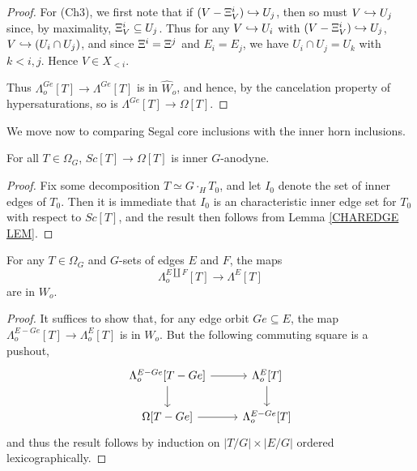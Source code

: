 \documentclass[a4paper,10pt,draft]{article}%
\begin{document}
\begin{proof}
      For (Ch3),
      we first note that if $(V - \Xi^i_V) \hookrightarrow U_j$, then so must $V \hookrightarrow U_j$
      since, by maximality, $\Xi^i_V \subseteq U_j$.
      Thus for any $V \hookrightarrow U_i$ with $(V - \Xi^i_V) \hookrightarrow U_j$,
      $V \hookrightarrow (U_i \cap U_j)$,
      and since $\Xi^i = \Xi^j$ and $E_i = E_j$, we have
      $U_i \cap U_j = U_k$ with $k < i,j$.
      Hence $V \in X_{< i}$.
      
      Thus $\Lambda^{G e}_o[T] \to \Lambda^{G e}[T]$ is in $\hat{W}_o$, and hence,
      by the cancelation property of hypersaturations,
      so is $\Lambda^{G e}[T] \to \Omega[T]$.
\end{proof}

We move now to comparing Segal core inclusions with the inner horn inclusions.

\begin{proposition}
      \label{SC_IN_GHORN_PROP}
      For all $T \in \Omega_G$, $Sc[T] \to \Omega[T]$ is inner $G$-anodyne.
\end{proposition}
\begin{proof}
      Fix some decomposition $T \simeq G \cdot_H T_0$, and let $I_0$ denote the set of inner edges of $T_0$.
      Then it is immediate that $I_0$ is an characteristic inner edge set for $T_0$ with respect to $Sc[T]$,
      and the result then follows from Lemma \ref{CHAREDGE LEM}.
\end{proof}

\begin{proposition}
      \label{GORB_OHORN_PROP}
      For any $T \in \Omega_G$ and $G$-sets of edges $E$ and $F$,
      the maps
      \begin{equation}
            \Lambda^{E \amalg F}_o[T] \to \Lambda^{E}[T]
      \end{equation}
      are in $W_o$.
\end{proposition}
\begin{proof}
      It suffices to show that,
      for any edge orbit $G e \subseteq E$,
      the map $\Lambda^{E - G e}_o[T] \to \Lambda^{E}_o[T]$ is in $W_o$.
      But the following commuting square is a pushout,
      \begin{equation}
            \begin{tikzcd}
                  \Lambda^{E - G e}_o[T - Ge] \arrow[r] \arrow[d]
                  &
                  \Lambda^{E}_o[T] \arrow[d]
                  \\
                  \Omega[T - G e] \arrow[r]
                  &
                  \Lambda^{E - G e}_o[T]
            \end{tikzcd}
      \end{equation}
      and thus the result follows by induction on $|T/G| \times |E/G|$ ordered lexicographically.
\end{proof}
\end{document}
